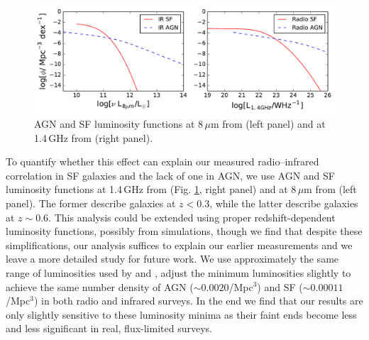 \documentclass{emulateapj}
\begin{document}
\begin{figure}[h]
\centering
\includegraphics[width=6in]{images/sim_rad_ir_luminosity_functions.pdf}
\caption{AGN and SF luminosity functions at 8\,$\mu$m from \citet{fu10} (left panel) and at 1.4\,GHz from \citet{mauch07} (right panel).}
\label{fig:luminosityfunctions}
\end{figure}

To quantify whether this effect can explain our measured radio--infrared correlation in SF galaxies and the lack of one in AGN, we use AGN and SF luminosity functions at 1.4\,GHz from \citet{mauch07} (Fig. \ref{fig:luminosityfunctions}, right panel) and at 8\,$\mu$m from \citet{fu10} (left panel). The former describe galaxies at $z<0.3$, while the latter describe galaxies at $z\sim0.6$. This analysis could be extended using proper redshift-dependent luminosity functions, possibly from simulations, though we find that despite these simplifications, our analysis suffices to explain our earlier measurements and we leave a more detailed study for future work. We use approximately the same range of luminosities used by \citet{mauch07} and \citet{fu10}, adjust the minimum luminosities slightly to achieve the same number density of AGN ($\sim0.0020$/Mpc$^3$) and SF ($\sim0.00011$/Mpc$^3$) in both radio and infrared surveys. In the end we find that our results are only slightly sensitive to these luminosity minima as their faint ends become less and less significant in real, flux-limited surveys. 
\end{document}
